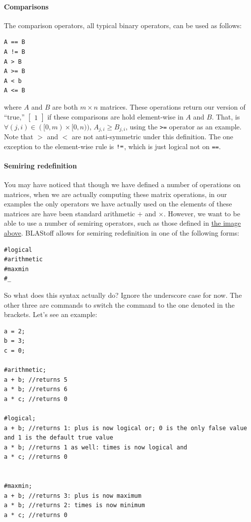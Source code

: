\paragraph{Comparisons}

The comparison operators, all typical binary operators,  can be used as follows:\begin{lstlisting}
A == B
A != B
A > B
A >= B
A < b
A <= B
\end{lstlisting}
where $A$ and $B$ are both $m\times n$ matrices.  These operations return our version of ``true,'' $\begin{bmatrix}1\end{bmatrix}$ if these comparisons are hold element-wise in $A$ and $B$.  That, is $\forall (j,i) \in ([0,m) \times [0, n))$, $A_{j,i} \geq B_{j,i}$, using the \verb|>=| operator as an example.  Note that $>$ and $<$ are not anti-symmetric under this definition.
The one exception to the element-wise rule is $\verb|!=|$, which is just logical not on \verb|==|.

\paragraph{Semiring redefinition}
You may have noticed that though we have defined a number of operations on matrices, when we are actually computing these matrix operations, in our examples the only operators we have actually used on the elements of these matrices are have been standard arithmetic $+$ and $\times$.  However, we want to be able to use a number of semiring operators, such as those defined in \hyperref[sec:semirings]{the image above}.  BLAStoff allows for semiring redefinition in one of the following forms:
\begin{lstlisting}
#logical
#arithmetic
#maxmin
#_
\end{lstlisting}
So what does this syntax actually do?  Ignore the underscore case for now.  The other three are commands to switch the command to the one denoted in the brackets.  Let's see an example:

\begin{lstlisting}
a = 2;
b = 3;
c = 0;

#arithmetic;
a + b; //returns 5
a * b; //returns 6
a * c; //returns 0

#logical;
a + b; //returns 1: plus is now logical or; 0 is the only false value and 1 is the default true value
a * b; //returns 1 as well: times is now logical and
a * c; //returns 0


#maxmin;
a + b; //returns 3: plus is now maximum
a * b; //returns 2: times is now minimum
a * c; //returns 0
\end{lstlisting}

